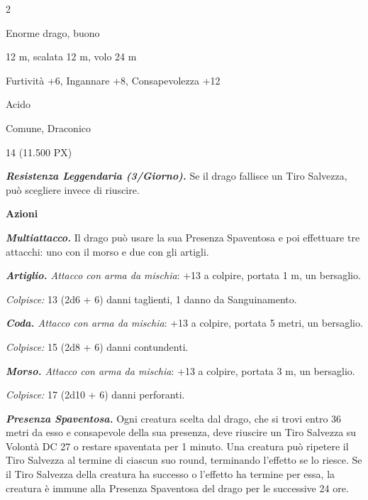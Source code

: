 \begin{multicols}{2}
{
\begin{description}[noitemsep, topsep=0pt, parsep=0pt, partopsep=0pt, itemsep=1pt, leftmargin=2.35cm,  labelwidth=2.2cm, itemindent=0cm, listparindent=0pt] %
\setlength{\baselineskip}{10pt}
\item[\textbf{Taglia/Tipo}] Enorme drago, buono
\item[\textbf{Caratt.}] 
\item[\textbf{Punti Ferita}] 
\item[\textbf{Movimento}] 12 m, scalata 12 m, volo 24 m
\item[\textbf{Tiri Salvez.}] 
\item[\textbf{Comp.}] Furtività +6, Ingannare +8, Consapevolezza +12
\item[\textbf{Imm. Danni}] Acido
\item[\textbf{Sensi}] 
\item[\textbf{Linguaggi}] Comune, Draconico
\item[\textbf{Sfida}] 14 (11.500 PX)
\end{description}
\smallskip

\emph{\textbf{Resistenza Leggendaria (3/Giorno).}} Se il drago fallisce un Tiro Salvezza, può scegliere invece di riuscire.

\textbf{Azioni}

\emph{\textbf{Multiattacco.}} Il drago può usare la sua Presenza Spaventosa e poi effettuare tre attacchi: uno con il morso e due con gli artigli.

\emph{\textbf{Artiglio.} Attacco con arma da mischia}: +13 a colpire, portata 1 m, un bersaglio.

\emph{Colpisce:} 13 (2d6 + 6) danni taglienti, 1 danno da Sanguinamento.

\emph{\textbf{Coda.} Attacco con arma da mischia}: +13 a colpire, portata 5 metri, un bersaglio.

\emph{Colpisce:} 15 (2d8 + 6) danni contundenti.

\emph{\textbf{Morso.} Attacco con arma da mischia}: +13 a colpire, portata 3 m, un bersaglio.

\emph{Colpisce:} 17 (2d10 + 6) danni perforanti.

\emph{\textbf{Presenza Spaventosa.}} Ogni creatura scelta dal drago, che si trovi entro 36 metri da esso e consapevole della sua presenza, deve riuscire un Tiro Salvezza su Volontà DC 27 o restare spaventata per 1 minuto. Una creatura può ripetere il Tiro Salvezza al termine di ciascun suo round, terminando l'effetto se lo riesce. Se il Tiro Salvezza della creatura ha successo o l'effetto ha termine per essa, la creatura è immune alla Presenza Spaventosa del drago per le successive 24 ore.

}
\end{multicols}
